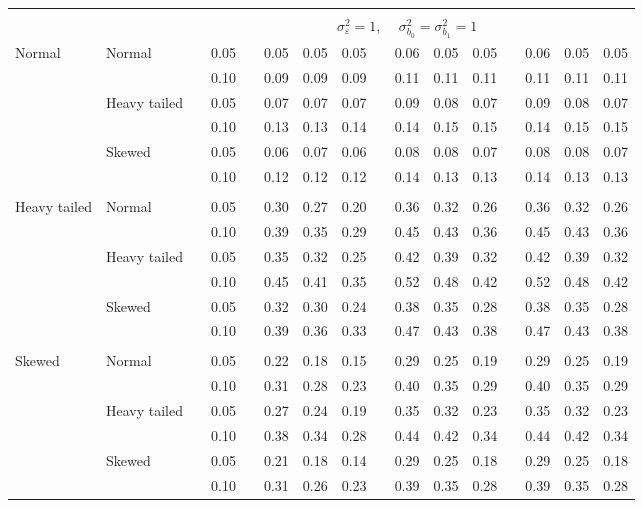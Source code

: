 \documentclass{article} %
\begin{document}
\begin{table}[ht]
\begin{scriptsize}
\begin{center}
\begin{tabular}{ll p{.1cm} c p{.1cm} rrr p{.1cm} rrr p{.1cm} rrr}
&&&&&&&&&&&&&&&\\
& && && \multicolumn{9}{c}{$\sigma_{\varepsilon}^2 = 1$, \ \ $\sigma_{b_0}^2 = \sigma_{b_1}^2 = 1$} \\ \cline{6-16}
\rowcolor{gray!20}Normal       & Normal       && 0.05 &&   0.05 & 0.05 & 0.05 && 0.06 & 0.05 & 0.05 && 0.06 & 0.05 & 0.05 \\ 
\rowcolor{gray!20}             &              && 0.10 &&   0.09 & 0.09 & 0.09 && 0.11 & 0.11 & 0.11 && 0.11 & 0.11 & 0.11 \\ 
\rowcolor{gray!20}             & Heavy tailed && 0.05 &&   0.07 & 0.07 & 0.07 && 0.09 & 0.08 & 0.07 && 0.09 & 0.08 & 0.07 \\ 
\rowcolor{gray!20}             &              && 0.10 &&   0.13 & 0.13 & 0.14 && 0.14 & 0.15 & 0.15 && 0.14 & 0.15 & 0.15 \\ 
\rowcolor{gray!20}             & Skewed       && 0.05 &&   0.06 & 0.07 & 0.06 && 0.08 & 0.08 & 0.07 && 0.08 & 0.08 & 0.07 \\ 
\rowcolor{gray!20}             &              && 0.10 &&   0.12 & 0.12 & 0.12 && 0.14 & 0.13 & 0.13 && 0.14 & 0.13 & 0.13 \\ 
             &&&&&&&&&&&&&&&\\
Heavy tailed & Normal       && 0.05 &&   0.30 & 0.27 & 0.20 && 0.36 & 0.32 & 0.26 && 0.36 & 0.32 & 0.26 \\ 
             &              && 0.10 &&   0.39 & 0.35 & 0.29 && 0.45 & 0.43 & 0.36 && 0.45 & 0.43 & 0.36 \\ 
             & Heavy tailed && 0.05 &&   0.35 & 0.32 & 0.25 && 0.42 & 0.39 & 0.32 && 0.42 & 0.39 & 0.32 \\ 
             &              && 0.10 &&   0.45 & 0.41 & 0.35 && 0.52 & 0.48 & 0.42 && 0.52 & 0.48 & 0.42 \\ 
             & Skewed       && 0.05 &&   0.32 & 0.30 & 0.24 && 0.38 & 0.35 & 0.28 && 0.38 & 0.35 & 0.28 \\ 
             &              && 0.10 &&   0.39 & 0.36 & 0.33 && 0.47 & 0.43 & 0.38 && 0.47 & 0.43 & 0.38 \\ 
             &&&&&&&&&&&&&&&\\
Skewed       & Normal       && 0.05 &&   0.22 & 0.18 & 0.15 && 0.29 & 0.25 & 0.19 && 0.29 & 0.25 & 0.19 \\ 
             &              && 0.10 &&   0.31 & 0.28 & 0.23 && 0.40 & 0.35 & 0.29 && 0.40 & 0.35 & 0.29 \\ 
             & Heavy tailed && 0.05 &&   0.27 & 0.24 & 0.19 && 0.35 & 0.32 & 0.23 && 0.35 & 0.32 & 0.23 \\ 
             &              && 0.10 &&   0.38 & 0.34 & 0.28 && 0.44 & 0.42 & 0.34 && 0.44 & 0.42 & 0.34 \\ 
             & Skewed       && 0.05 &&   0.21 & 0.18 & 0.14 && 0.29 & 0.25 & 0.18 && 0.29 & 0.25 & 0.18 \\ 
             &              && 0.10 &&   0.31 & 0.26 & 0.23 && 0.39 & 0.35 & 0.28 && 0.39 & 0.35 & 0.28 \\ 



\end{tabular}
\end{center}
\end{scriptsize}
\end{table}
\end{document}
